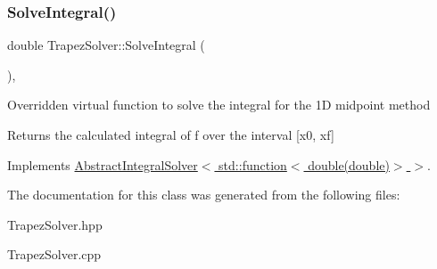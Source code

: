 \subsubsection{\texorpdfstring{Solve\+Integral()}{SolveIntegral()}}
{\footnotesize\ttfamily double Trapez\+Solver\+::\+Solve\+Integral (\begin{DoxyParamCaption}{ }\end{DoxyParamCaption})\hspace{0.3cm}{\ttfamily [override]}, {\ttfamily [virtual]}}

Overridden virtual function to solve the integral for the 1D midpoint method \begin{DoxyReturn}{Returns}
the calculated integral of f over the interval \mbox{[}x0, xf\mbox{]} 
\end{DoxyReturn}


Implements \hyperlink{class_abstract_integral_solver_ad87cb44c5ef3122bc95be48f473ba399}{Abstract\+Integral\+Solver$<$ std\+::function$<$ double(double)$>$ $>$}.



The documentation for this class was generated from the following files\+:\begin{DoxyCompactItemize}
\item 
Trapez\+Solver.\+hpp\item 
Trapez\+Solver.\+cpp\end{DoxyCompactItemize}
